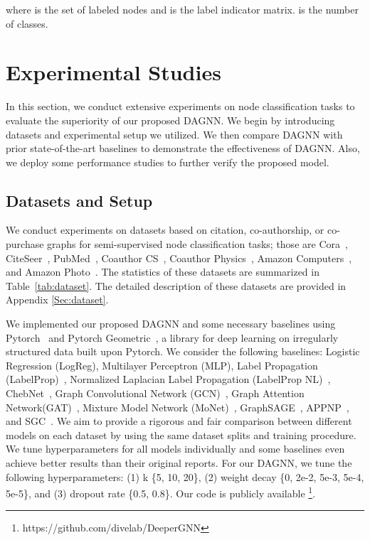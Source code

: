 \documentclass[sigconf]{acmart}
\begin{document}
where  is the set of labeled nodes and  is the label indicator matrix.  is
the number of classes.



\section{Experimental Studies}

In this section, we conduct extensive experiments on node
classification tasks to evaluate the superiority of our proposed
DAGNN. We begin by introducing datasets and experimental setup we
utilized. We then compare DAGNN with prior state-of-the-art
baselines to demonstrate the effectiveness of DAGNN. Also, we
deploy some performance studies to further verify the proposed
model.


\subsection{Datasets and Setup}

We conduct experiments on  datasets based on citation,
co-authorship, or co-purchase graphs for semi-supervised node
classification tasks; those are Cora~\cite{sen2008collective},
CiteSeer~\cite{sen2008collective},
PubMed~\cite{sen2008collective}, Coauthor
CS~\cite{shchur2018pitfalls}, Coauthor
Physics~\cite{shchur2018pitfalls}, Amazon
Computers~\cite{shchur2018pitfalls}, and Amazon
Photo~\cite{shchur2018pitfalls}. The statistics of these datasets are summarized in Table~\ref{tab:dataset}. The detailed description of these datasets are provided in Appendix \ref{Sec:dataset}.

We implemented our proposed DAGNN and some necessary baselines
using Pytorch~\cite{paszke2017automatic} and Pytorch
Geometric~\cite{Fey/Lenssen/2019}, a library for deep learning on
irregularly structured data built upon Pytorch. We consider
the following baselines: Logistic Regression (LogReg), Multilayer
Perceptron (MLP), Label Propagation
(LabelProp)~\cite{chapelle2009semi}, Normalized Laplacian Label
Propagation (LabelProp NL)~\cite{chapelle2009semi},
ChebNet~\cite{defferrard2016convolutional}, Graph Convolutional
Network (GCN)~\cite{kipf2016semi}, Graph Attention
Network(GAT)~\cite{velivckovic2017graph}, Mixture Model Network
(MoNet)~\cite{monti2017geometric},
GraphSAGE~\cite{hamilton2017inductive},
APPNP~\cite{klicpera2018predict}, and
SGC~\cite{wu2019simplifying}. We aim to provide a rigorous
and fair comparison between different models on each dataset by
using the same dataset splits and training procedure. We tune hyperparameters for all models individually and some baselines even achieve better results than their original reports. For our DAGNN, we tune the following hyperparameters: (1) k  \{5, 10, 20\}, (2) weight decay  \{0, 2e-2, 5e-3, 5e-4, 5e-5\}, and (3) dropout rate  \{0.5, 0.8\}. Our code is publicly available \footnote{https://github.com/divelab/DeeperGNN}.
\end{document}

